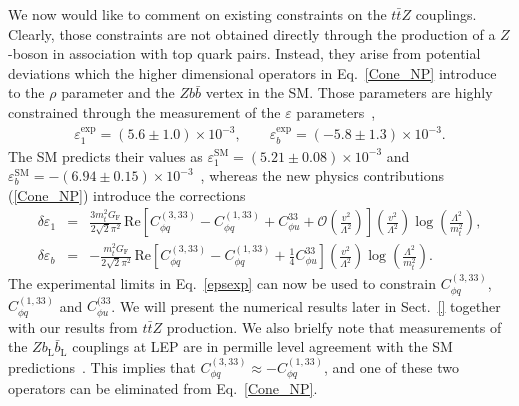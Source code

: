 \documentclass[preprint]{JHEP3} %
\def\ttbZ{t\bar{t}Z}
\newcommand{\be}{\begin{eqnarray}}
\newcommand{\ee}{\end{eqnarray}}
\begin{document}
We now would like to comment on existing constraints on the $\ttbZ$ couplings.
Clearly, those constraints are not obtained directly through the production of a $Z$-boson in association with top quark pairs.
Instead, they arise from potential deviations which the higher dimensional operators in Eq.~\ref{Cone_NP} introduce to the $\rho$ parameter and the $Z b \bar{b}$ vertex in the SM.
Those parameters are highly constrained through the measurement of the $\varepsilon$ parameters~\cite{},
\be
   \label{epsexp}
   \varepsilon_1^\mathrm{exp} = (5.6 \pm 1.0) \times 10^{-3}, \quad \quad \varepsilon_b^\mathrm{exp} = (-5.8 \pm 1.3) \times 10^{-3}.
\ee
The SM predicts their values as $\varepsilon_1^\mathrm{SM} = (5.21 \pm 0.08) \times 10^{-3} $ and $\varepsilon_b^\mathrm{SM} = -(6.94 \pm 0.15) \times 10^{-3}$~\cite{},
whereas the new physics contributions (\ref{Cone_NP}) introduce the corrections~\cite{}
\be
   \delta \varepsilon_1 &=& \frac{3 m_t^2 G_\mathrm{F}}{2\sqrt{2}\pi^2}  
   \, \mathrm{Re}\left[  C^{(3,33)}_{\phi q}-C^{(1,33)}_{\phi q} + C^{33}_{\phi u} + \mathcal{O}\left(\frac{v^2}{\Lambda^2} \right) \right]
   \left( \frac{v^2}{\Lambda^2} \right) \log\left(\frac{\Lambda^2}{m_t^2}\right),
   \\
   \delta \varepsilon_b &=& -\frac{m_t^2 G_\mathrm{F}}{2\sqrt{2}\pi^2} 
   \, \mathrm{Re}\left[  C^{(3,33)}_{\phi q}-C^{(1,33)}_{\phi q} + \frac14 C^{33}_{\phi u}  \right]
   \left( \frac{v^2}{\Lambda^2} \right)\log\left(\frac{\Lambda^2}{m_t^2}\right).
\ee
The experimental limits in Eq.~\ref{epsexp} can now be used to constrain $C^{(3,33)}_{\phi q}$,  $C^{(1,33)}_{\phi q}$ and $C^{(33}_{\phi u}$.
We will present the numerical results later in Sect.~\ref{} together with our results from $\ttbZ$ production.
We also brielfy note that measurements of the $Z b_\mathrm{L} \bar{b}_\mathrm{L}$ couplings at LEP are in permille level agreement 
with the SM predictions~\cite{}. 
This implies that $  C^{(3,33)}_{\phi q} \approx - C^{(1,33)}_{\phi q}$,
and one of these two operators can be eliminated from Eq.~\ref{Cone_NP}.
\end{document}

